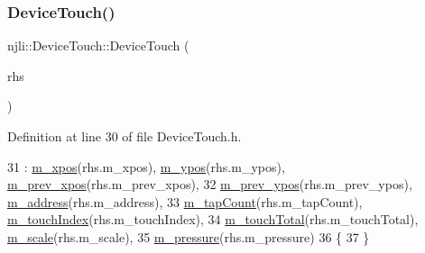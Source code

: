 \subsubsection{\texorpdfstring{Device\+Touch()}{DeviceTouch()}\hspace{0.1cm}{\footnotesize\ttfamily [2/3]}}
{\footnotesize\ttfamily njli\+::\+Device\+Touch\+::\+Device\+Touch (\begin{DoxyParamCaption}\item[{const \mbox{\hyperlink{classnjli_1_1_device_touch}{Device\+Touch}} \&}]{rhs }\end{DoxyParamCaption})\hspace{0.3cm}{\ttfamily [inline]}}



Definition at line 30 of file Device\+Touch.\+h.


\begin{DoxyCode}
31         : \mbox{\hyperlink{classnjli_1_1_device_touch_aa459469f52287f2085402117c13512f8}{m\_xpos}}(rhs.m\_xpos), \mbox{\hyperlink{classnjli_1_1_device_touch_aec3c40c2adb1ba1bf5a13bf366bd3b6d}{m\_ypos}}(rhs.m\_ypos), \mbox{\hyperlink{classnjli_1_1_device_touch_aefd5c83cec6edc7dcb7edeec2144c470}{m\_prev\_xpos}}(rhs.m\_prev\_xpos),
32           \mbox{\hyperlink{classnjli_1_1_device_touch_adc6f1bce3fa81e81f1a01ca55b2b3db7}{m\_prev\_ypos}}(rhs.m\_prev\_ypos), \mbox{\hyperlink{classnjli_1_1_device_touch_adf8b9a7a96b90d0639aca0b9982a95d7}{m\_address}}(rhs.m\_address),
33           \mbox{\hyperlink{classnjli_1_1_device_touch_af4506b66dcc8e44597244c9a6827bd0d}{m\_tapCount}}(rhs.m\_tapCount), \mbox{\hyperlink{classnjli_1_1_device_touch_a8702a0eb417f912b2b8733b2f21a8060}{m\_touchIndex}}(rhs.m\_touchIndex),
34           \mbox{\hyperlink{classnjli_1_1_device_touch_ad36aeb2b221ff37cf29d6b5f837d0d93}{m\_touchTotal}}(rhs.m\_touchTotal), \mbox{\hyperlink{classnjli_1_1_device_touch_ae07cde00eac9eb6e816f261bdb0df9d4}{m\_scale}}(rhs.m\_scale),
35           \mbox{\hyperlink{classnjli_1_1_device_touch_a1fbc998f1460afc213b0ba31410599bd}{m\_pressure}}(rhs.m\_pressure)
36     \{
37     \}
\end{DoxyCode}
\mbox{\label{classnjli_1_1_device_touch_aa0c19c372c26f011e3b60f0fbc5e8c87}} 
